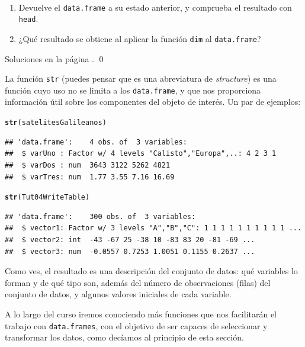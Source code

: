 \documentclass[10pt,a4paper]{article}\usepackage[]{graphicx}\usepackage[]{color}
\makeatletter
\newcommand{\hlstd}[1]{\textcolor[rgb]{0.345,0.345,0.345}{#1}}%
\newcommand{\hlkwd}[1]{\textcolor[rgb]{0.737,0.353,0.396}{\textbf{#1}}}%
\newenvironment{kframe}{%
 \def\at@end@of@kframe{}%
 \ifinner\ifhmode%
  \def\at@end@of@kframe{\end{minipage}}%
  \begin{minipage}{\columnwidth}%
 \fi\fi%
 \def\FrameCommand##1{\hskip\@totalleftmargin \hskip-\fboxsep
 \colorbox{shadecolor}{##1}\hskip-\fboxsep
     \hskip-\linewidth \hskip-\@totalleftmargin \hskip\columnwidth}%
 \MakeFramed {\advance\hsize-\width
   \@totalleftmargin\z@ \linewidth\hsize
   \@setminipage}}%
 {\par\unskip\endMakeFramed%
 \at@end@of@kframe}
\newenvironment{knitrout}{}{} %
\makeatother
\begin{document}
\begin{ejercicio}
\label{tut04:ejercicio06}
\quad\\
\begin{enumerate}
  \item Devuelve el {\tt data.frame} a su estado anterior, y comprueba el resultado con {\tt head}.
  \item ¿Qué resultado se obtiene al aplicar la función {\tt dim} al {\tt data.frame}?
\end{enumerate}
Soluciones en la página \pageref{tut04:ejercicio06:sol}.
\qed
\end{ejercicio}

La función {\tt str} (puedes pensar que es una abreviatura de {\em structure}) es una función cuyo uso no se limita a los {\tt data.frame}, y que nos proporciona información útil sobre los componentes del objeto de interés. Un par de ejemplos:
\begin{knitrout}
\color{fgcolor}\begin{kframe}
\begin{alltt}
\hlkwd{str}\hlstd{(satelitesGalileanos)}
\end{alltt}
\begin{verbatim}
## 'data.frame':	4 obs. of  3 variables:
##  $ varUno : Factor w/ 4 levels "Calisto","Europa",..: 4 2 3 1
##  $ varDos : num  3643 3122 5262 4821
##  $ varTres: num  1.77 3.55 7.16 16.69
\end{verbatim}
\begin{alltt}
\hlkwd{str}\hlstd{(Tut04WriteTable)}
\end{alltt}
\begin{verbatim}
## 'data.frame':	300 obs. of  3 variables:
##  $ vector1: Factor w/ 3 levels "A","B","C": 1 1 1 1 1 1 1 1 1 1 ...
##  $ vector2: int  -43 -67 25 -38 10 -83 83 20 -81 -69 ...
##  $ vector3: num  -0.0557 0.7253 1.0051 0.1155 0.2637 ...
\end{verbatim}
\end{kframe}
\end{knitrout}
Como ves, el resultado es una descripción del conjunto de datos: qué variables lo forman y de qué tipo son, además del número de observaciones (filas) del conjunto de datos, y algunos valores iniciales de cada variable.

A lo largo del curso iremos conociendo más funciones que nos facilitarán el trabajo con {\tt data.frames}, con el objetivo de ser capaces de seleccionar y transformar los datos, como decíamos al principio de esta sección.
\end{document}
